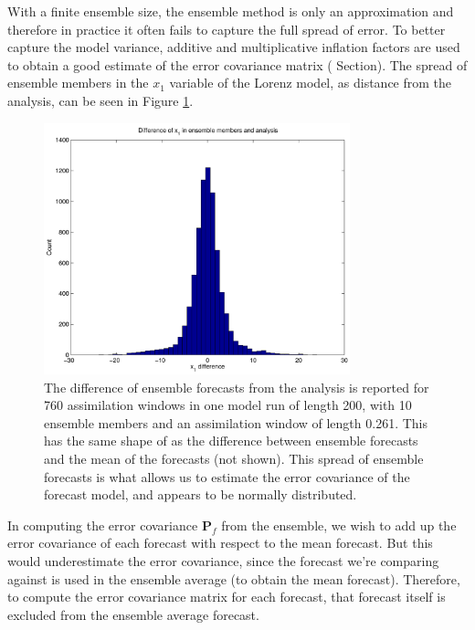 \documentclass[pre,twocolumn,twoside,byrevtex,superscriptaddress]{revtex4}
\newcommand{\mbP}{\mathbf{P}}
\begin{document}
With a finite ensemble size, the ensemble method is only an approximation and therefore in practice it often fails to capture the full spread of error.
To better capture the model variance, additive and multiplicative inflation factors are used to obtain a good estimate of the error covariance matrix ( Section).
The spread of ensemble members in the $x_1$ variable of the Lorenz model, as distance from the analysis, can be seen in Figure \ref{fig:EnKFhist}.

\begin{figure}[h]
  \centering
  \includegraphics[width=0.79\textwidth]{fig15_EnKF-histogram-analysis.pdf}
  \caption[The difference of ensemble forecasts from the analysis is reported for 760 assimilation windows in one model run of length 200, with 10 ensemble members and an assimilation window of length 0.261]{
    The difference of ensemble forecasts from the analysis is reported for 760 assimilation windows in one model run of length 200, with 10 ensemble members and an assimilation window of length 0.261.
    This has the same shape of as the difference between ensemble forecasts and the mean of the forecasts (not shown).
    This spread of ensemble forecasts is what allows us to estimate the error covariance of the forecast model, and appears to be normally distributed.
  }
  \label{fig:EnKFhist}
\end{figure}

In computing the error covariance $\mbP_f$ from the ensemble, we wish to add up the error covariance of each forecast with respect to the mean forecast. 
But this would underestimate the error covariance, since the forecast we're comparing against is used in the ensemble average (to obtain the mean forecast).
Therefore, to compute the error covariance matrix for each forecast, that forecast itself is excluded from the ensemble average forecast.
\end{document}
